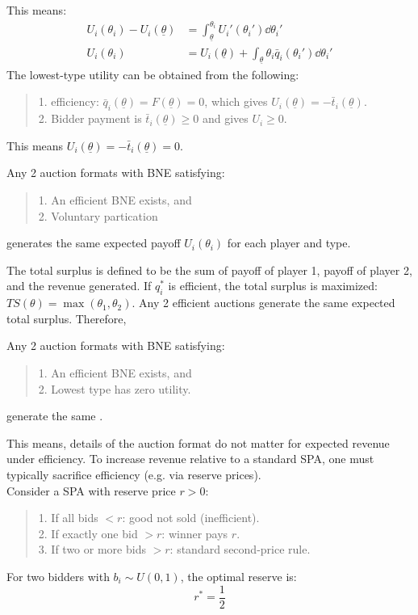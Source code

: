 This means:
\begin{align*}
    U_i(\theta_i) - U_i(\underline{\theta}) &= \int_{\underline{\theta}}^{\theta_i} U_i'(\theta_i') \dd \theta_i' \\
    U_i(\theta_i) &= U_i(\underline{\theta}) + \int_{\underline{\theta}}{\theta_i} \bar{q}_i(\theta_i') \dd \theta_i'
\end{align*}
The lowest-type utility can be obtained from the following:
\begin{quote}
    1. efficiency: $\bar{q}_i(\underline{\theta}) = F(\underline{\theta}) = 0$, which gives $U_i(\underline{\theta}) = -\bar{t}_i(\underline{\theta})$. \\
    2. Bidder payment is $\bar{t}_i(\underline{\theta}) \ge 0$ and  gives $U_i \ge 0$.
\end{quote}
This means $U_i(\underline{\theta}) = -\bar{t}_i(\underline{\theta}) = 0$.
\begin{proposition}
    Any 2 auction formats with BNE satisfying:
    \begin{quote}
        1. An efficient BNE exists, and \\
        2. Voluntary partication
    \end{quote}
    generates the same expected payoff $U_i(\theta_i)$ for each player and type.
\end{proposition}
The total surplus is defined to be the sum of payoff of player 1, payoff of player 2, and the revenue generated. If $q_i^*$ is efficient, the total surplus is maximized: $TS(\theta) = \max(\theta_1, \theta_2)$. Any 2 efficient auctions generate the same expected total surplus. Therefore,
\begin{theorem}
    Any 2 auction formats with BNE satisfying:
    \begin{quote}
        1. An efficient BNE exists, and \\
        2. Lowest type has zero utility.
    \end{quote}
    generate the same .
\end{theorem}
This means, details of the auction format do not matter for expected revenue under efficiency. To increase revenue relative to a standard SPA, one must typically sacrifice efficiency (e.g. via reserve prices). \\
Consider a SPA with reserve price $r > 0$:
\begin{quote}
    1. If all bids $< r$: good not sold (inefficient). \\
    2. If exactly one bid $> r$: winner pays $r$. \\
    3. If two or more bids $> r$: standard second-price rule.
\end{quote}
For two bidders with $b_i \sim U(0, 1)$, the optimal reserve is:
$$r^* = \frac{1}{2}$$
